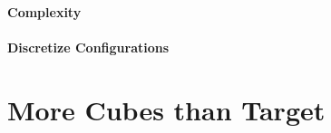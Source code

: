 \paragraph{Complexity}


\paragraph{Discretize Configurations}





\section{More Cubes than Target}
\label{sec:more_cubes}

